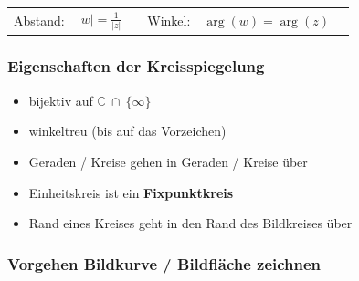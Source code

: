 \begin{minipage}{0.64\columnwidth}
    \setlength{\tabcolsep}{4pt}
    \begin{tabular}{llllll}
        Abstand: & $\vert w \vert = \frac{1}{\vert z \vert }$ &  &
        Winkel:  & $\arg(w) = \arg(z)$
    \end{tabular}
    \setlength{\tabcolsep}{6pt}

    \subsubsection*{Eigenschaften der Kreisspiegelung}

    \begin{itemize}
        \item bijektiv auf $\mathbb{C} \: \cap \: \lbrace \infty \rbrace$
        \item winkeltreu (bis auf das Vorzeichen)
        \item Geraden / Kreise gehen in Geraden / Kreise über

        \item Einheitskreis ist ein \textbf{Fixpunktkreis}
        \item Rand eines Kreises geht in den Rand des Bildkreises über
    \end{itemize}
\end{minipage}
\begin{minipage}{0.36\columnwidth}
    
\end{minipage}

\subsubsection*{Vorgehen Bildkurve / Bildfläche zeichnen}

